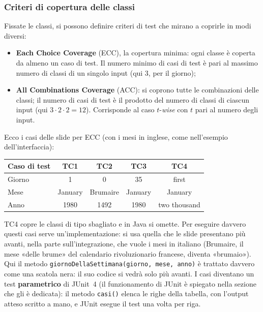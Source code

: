 
\subsubsection*{Criteri di copertura delle classi}

Fissate le classi, si possono definire criteri di test che mirano a coprirle in modi diversi:

\begin{itemize}
  \item \textbf{Each Choice Coverage} (ECC), la copertura minima: ogni classe è coperta da almeno un caso di test. Il
        numero minimo di casi di test è pari al massimo numero di classi di un singolo input (qui 3, per il giorno);
  \item \textbf{All Combinations Coverage} (ACC): si coprono tutte le combinazioni delle classi; il numero di casi di
        test è il prodotto del numero di classi di ciascun input (qui \(3 \cdot 2 \cdot 2 = 12\)). Corrisponde al caso
        \(t\)-\textit{wise} con \(t\) pari al numero degli input.
\end{itemize}

Ecco i casi delle slide per ECC (con i mesi in inglese, come nell'esempio dell'interfaccia):

\begin{center}
\renewcommand{\arraystretch}{1.2}
\begin{tabular}{lcccc}
  \textbf{Caso di test} & \textbf{TC1} & \textbf{TC2} & \textbf{TC3} & \textbf{TC4} \\ \hline
  Giorno & 1 & 0 & 35 & first \\
  Mese & January & Brumaire & January & January \\
  Anno & 1980 & 1492 & 1980 & two thousand \\
\end{tabular}
\end{center}

TC4 copre le classi di tipo sbagliato e in Java si omette. Per eseguire davvero questi casi serve un'implementazione: si
usa quella che le slide presentano più avanti, nella parte sull'integrazione, che vuole i mesi in italiano (Brumaire,
il mese «delle brume» del calendario rivoluzionario francese, diventa «brumaio»). Qui il metodo
\texttt{giornoDellaSettimana(giorno, mese, anno)} è trattato davvero come una scatola nera: il suo codice si vedrà solo
più avanti. I casi diventano un test \textbf{parametrico} di JUnit~4 (il funzionamento di JUnit è spiegato nella sezione
che gli è dedicata): il metodo \texttt{casi()} elenca le righe della tabella, con l'output atteso scritto a mano, e
JUnit esegue il test una volta per riga.

